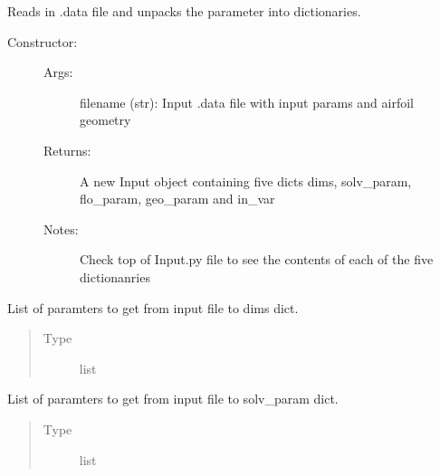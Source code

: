 \documentclass[letterpaper,10pt,english]{sphinxmanual}
\begin{document}
\begin{fulllineitems}
\label{\detokenize{autoapi/Input/index:Input.Input}}
\sphinxAtStartPar
Reads in .data file and unpacks the parameter into dictionaries.
\begin{description}
\item[{Constructor:}] \leavevmode\begin{description}
\item[{Args:}] \leavevmode
\sphinxAtStartPar
filename (str): Input .data file with input params and airfoil geometry

\item[{Returns:}] \leavevmode
\sphinxAtStartPar
A new Input object containing five dicts \sphinxhyphen{} dims, solv\_param, flo\_param, geo\_param and in\_var

\item[{Notes:}] \leavevmode
\sphinxAtStartPar
Check top of Input.py file to see the contents of each of the five dictionanries

\end{description}

\end{description}

\begin{fulllineitems}
\label{\detokenize{autoapi/Input/index:Input.Input.dim_p}}
\sphinxAtStartPar
List of paramters to get from input file to dims dict.
\begin{quote}\begin{description}
\item[{Type}] \leavevmode
\sphinxAtStartPar
list

\end{description}\end{quote}

\end{fulllineitems}


\begin{fulllineitems}
\label{\detokenize{autoapi/Input/index:Input.Input.solv_p}}
\sphinxAtStartPar
List of paramters to get from input file to solv\_param dict.
\begin{quote}\begin{description}
\item[{Type}] \leavevmode
\sphinxAtStartPar
list


\end{description}
\end{quote}
\end{fulllineitems}
\end{fulllineitems}
\end{document}
